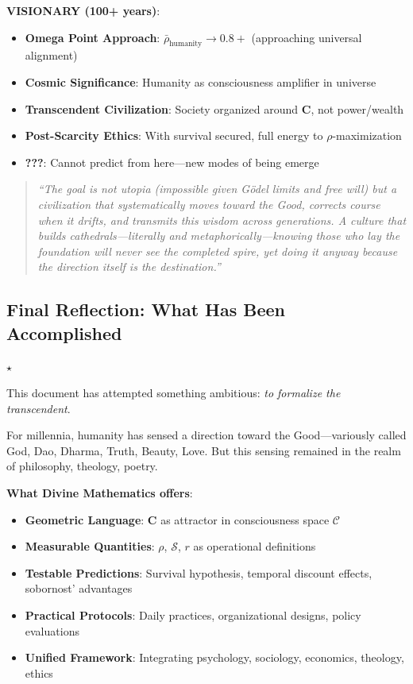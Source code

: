 \documentclass[11pt,a4paper]{article}
\theoremstyle{definition}
\theoremstyle{remark}
\newcommand{\CC}{\mathcal{C}}
\begin{document}
\begin{small}
\begin{enumerate}
\begin{protocol}
\textbf{VISIONARY (100+ years)}:
\begin{itemize}
    \item \textbf{Omega Point Approach}: \(\bar{\rho}_{\text{humanity}} \to 0.8+\) (approaching universal alignment)
    \item \textbf{Cosmic Significance}: Humanity as consciousness amplifier in universe
    \item \textbf{Transcendent Civilization}: Society organized around \(\mathbf{C}\), not power/wealth
    \item \textbf{Post-Scarcity Ethics}: With survival secured, full energy to \(\rho\)-maximization
    \item \textbf{???}: Cannot predict from here—new modes of being emerge
\end{itemize}

\begin{quote}
\textit{``The goal is not utopia (impossible given Gödel limits and free will) but a civilization that systematically moves toward the Good, corrects course when it drifts, and transmits this wisdom across generations. A culture that builds cathedrals—literally and metaphorically—knowing those who lay the foundation will never see the completed spire, yet doing it anyway because the direction itself is the destination.''}
\end{quote}

\subsection{Final Reflection: What Has Been Accomplished}

\begin{center}
\(\star\)
\end{center}

This document has attempted something ambitious: \textit{to formalize the transcendent}.

For millennia, humanity has sensed a direction toward the Good—variously called God, Dao, Dharma, Truth, Beauty, Love. But this sensing remained in the realm of philosophy, theology, poetry.

\textbf{What Divine Mathematics offers}:
\begin{itemize}
    \item \textbf{Geometric Language}: \(\mathbf{C}\) as attractor in consciousness space \(\CC\)
    \item \textbf{Measurable Quantities}: \(\rho\), \(\mathcal{S}\), \(r\) as operational definitions
    \item \textbf{Testable Predictions}: Survival hypothesis, temporal discount effects, sobornost' advantages
    \item \textbf{Practical Protocols}: Daily practices, organizational designs, policy evaluations
    \item \textbf{Unified Framework}: Integrating psychology, sociology, economics, theology, ethics
\end{itemize}


\end{protocol}
\end{enumerate}
\end{small}
\end{document}
